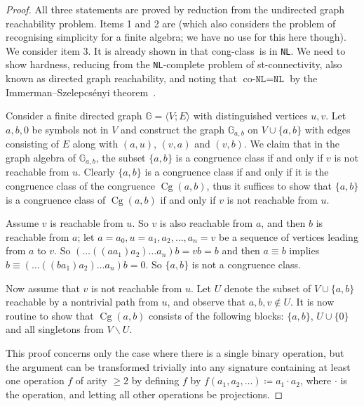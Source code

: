 \documentclass[reqno]{amsart}
\theoremstyle{plain}
\theoremstyle{definition}
\newcommand{\congclass}{\textsf{cong-class}}
\newcommand{\Cg}{\operatorname{Cg}}
\begin{document}
\begin{proof}
All three statements are proved by reduction from the undirected graph reachability problem.  Items 1 and 2 are \cite[Theorem 3.5]{berslu02} (which also considers the problem of recognising simplicity for a finite algebra; we have no use for this here though).  
We consider item 3.  
It is already shown in \cite{berslu02} that \congclass\ is in  \texttt{NL}.  
We need to show hardness, reducing from the \texttt{NL}-complete problem of st-connectivity, also known as directed graph reachability, and noting that $\text{co-}\texttt{NL}=\texttt{NL}$ by the Immerman–Szelepcs\'{e}nyi theorem~\cite{imm}.

Consider a finite directed graph $\mathbb{G}=\langle V;E\rangle$ with distinguished vertices $u,v$.  Let $a,b,0$ be symbols not in $V$ and construct the graph $\mathbb{G}_{a,b}$ on $V\cup\{a,b\}$ with edges consisting of $E$ along with $(a,u)$, $(v,a)$ and $(v,b)$.  We claim that in the graph algebra of $\mathbb{G}_{a,b}$, the subset $\{a,b\}$ is a congruence class if and only if $v$ is not reachable from $u$.  Clearly $\{a,b\}$ is a congruence class if and only if it is the congruence class of the congruence $\Cg(a,b)$, thus it suffices to show that $\{a,b\}$ is a congruence class of $\Cg(a,b)$ if and only if $v$ is not reachable from $u$.

Assume $v$ is reachable from $u$.  So $v$ is also reachable from $a$, and then $b$ is reachable from $a$; let $a=a_0,u=a_1,a_2,\dots,a_n=v$ be a sequence of vertices leading from $a$ to $v$.  So $(\dots ((aa_1)a_2)\dots a_n)b=vb=b$ and then $a\equiv b$ implies $b\equiv (\dots ((ba_1)a_2)\dots a_n)b=0$.  So $\{a,b\}$ is not a congruence class.  

Now assume that $v$ is not reachable from $u$.  Let $U$ denote the subset of $V\cup\{a,b\}$ reachable by a nontrivial path from $u$, and observe that $a,b,v\notin U$.  It is now routine to show that $\Cg(a,b)$ consists of the following blocks: $\{a,b\}$, $U\cup\{0\}$ and all singletons from $V\backslash U$.

This proof concerns only the case where there is a single binary operation, but the argument can be transformed trivially into any signature containing at least one operation $f$ of arity $\geq 2$ by defining $f$ by $f(a_1,a_2,\dots)\coloneqq a_1\cdot a_2$, where $\cdot$ is the operation, and letting all other operations be projections.
\end{proof}
\end{document}
